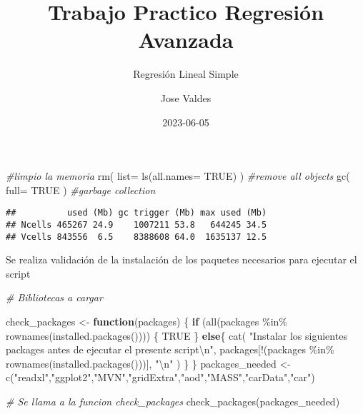 \documentclass[
]{article}
\title{Trabajo Practico Regresión Avanzada}
\subtitle{Regresión Lineal Simple}
\author{Jose Valdes}
\date{2023-06-05}
\newenvironment{Shaded}{\begin{snugshade}}{\end{snugshade}}
\newcommand{\AttributeTok}[1]{\textcolor[rgb]{0.77,0.63,0.00}{#1}}
\newcommand{\CommentTok}[1]{\textcolor[rgb]{0.56,0.35,0.01}{\textit{#1}}}
\newcommand{\ConstantTok}[1]{\textcolor[rgb]{0.00,0.00,0.00}{#1}}
\newcommand{\ControlFlowTok}[1]{\textcolor[rgb]{0.13,0.29,0.53}{\textbf{#1}}}
\newcommand{\FunctionTok}[1]{\textcolor[rgb]{0.00,0.00,0.00}{#1}}
\newcommand{\NormalTok}[1]{#1}
\newcommand{\OtherTok}[1]{\textcolor[rgb]{0.56,0.35,0.01}{#1}}
\newcommand{\SpecialCharTok}[1]{\textcolor[rgb]{0.00,0.00,0.00}{#1}}
\newcommand{\StringTok}[1]{\textcolor[rgb]{0.31,0.60,0.02}{#1}}
\begin{document}
\maketitle

{
\setcounter{tocdepth}{5}
\tableofcontents
}
\begin{Shaded}
\begin{Highlighting}[]
\CommentTok{\#limpio la memoria}
\FunctionTok{rm}\NormalTok{( }\AttributeTok{list=} \FunctionTok{ls}\NormalTok{(}\AttributeTok{all.names=} \ConstantTok{TRUE}\NormalTok{) )  }\CommentTok{\#remove all objects}
\FunctionTok{gc}\NormalTok{( }\AttributeTok{full=} \ConstantTok{TRUE}\NormalTok{ )                 }\CommentTok{\#garbage collection}
\end{Highlighting}
\end{Shaded}

\begin{verbatim}
##          used (Mb) gc trigger (Mb) max used (Mb)
## Ncells 465267 24.9    1007211 53.8   644245 34.5
## Vcells 843556  6.5    8388608 64.0  1635137 12.5
\end{verbatim}

Se realiza validación de la instalación de los paquetes necesarios para
ejecutar el script

\begin{Shaded}
\begin{Highlighting}[]
\CommentTok{\# Bibliotecas a cargar}

\NormalTok{check\_packages }\OtherTok{\textless{}{-}} \ControlFlowTok{function}\NormalTok{(packages) \{}
  \ControlFlowTok{if}\NormalTok{ (}\FunctionTok{all}\NormalTok{(packages }\SpecialCharTok{\%in\%} \FunctionTok{rownames}\NormalTok{(}\FunctionTok{installed.packages}\NormalTok{()))) \{}
    \ConstantTok{TRUE}
\NormalTok{  \} }\ControlFlowTok{else}\NormalTok{\{}
    \FunctionTok{cat}\NormalTok{(}
      \StringTok{"Instalar los siguientes packages antes de ejecutar el presente script}\SpecialCharTok{\textbackslash{}n}\StringTok{"}\NormalTok{,}
\NormalTok{      packages[}\SpecialCharTok{!}\NormalTok{(packages }\SpecialCharTok{\%in\%} \FunctionTok{rownames}\NormalTok{(}\FunctionTok{installed.packages}\NormalTok{()))],}
      \StringTok{"}\SpecialCharTok{\textbackslash{}n}\StringTok{"}
\NormalTok{    )}
\NormalTok{  \}}
\NormalTok{\}}
\NormalTok{packages\_needed }\OtherTok{\textless{}{-}} \FunctionTok{c}\NormalTok{(}\StringTok{"readxl"}\NormalTok{,}\StringTok{"ggplot2"}\NormalTok{,}\StringTok{"MVN"}\NormalTok{,}\StringTok{"gridExtra"}\NormalTok{,}\StringTok{"aod"}\NormalTok{,}\StringTok{"MASS"}\NormalTok{,}\StringTok{"carData"}\NormalTok{,}\StringTok{"car"}\NormalTok{)}

\CommentTok{\# Se llama a la funcion check\_packages}
\FunctionTok{check\_packages}\NormalTok{(packages\_needed)}
\end{Highlighting}
\end{Shaded}
\end{document}
